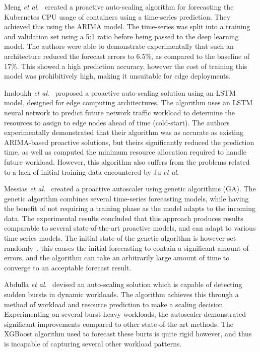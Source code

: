 Meng \textit{et al}.~\cite{meng2016crupa} created a proactive auto-scaling algorithm for forecasting the Kubernetes CPU usage of containers using a time-series prediction. They achieved this using the ARIMA model. The time-series was split into a training and validation set using a 5:1 ratio before being passed to the deep learning model. The authors were able to demonstrate experimentally that such an architecture reduced the forecast errors to 6.5\%, as compared to the baseline of 17\%. This showed a high prediction accuracy, however the cost of training this model was prohibitively high, making it unsuitable for edge deployments.\par

Imdoukh \textit{et al}.~\cite{imdoukh2020machine} proposed a proactive auto-scaling solution using an LSTM model, designed for edge computing architectures. The algorithm uses an LSTM neural network to predict future network traffic workload to determine the resources to assign to edge nodes ahead of time (cold-start). The authors experimentally demonstrated that their algorithm was as accurate as existing ARIMA-based proactive solutions, but theirs significantly reduced the prediction time, as well as computed the minimum resource allocation required to handle future workload. However, this algorithm also suffers from the problems related to a lack of initial training data encountered by Ju \textit{et al}.~\cite{ju2021proactive}\par

Messias \textit{et al}.~\cite{messias2016combining} created a proactive autoscaler using genetic algorithms (GA). The genetic algorithm combines several time-series forecasting models, while having the benefit of not requiring a training phase as the model adapts to the incoming data. The experimental results concluded that this approach produces results comparable to several state-of-the-art proactive models, and can adapt to various time series models. The initial state of the genetic algorithm is however set randomly~\cite{lambora2019genetic}, this causes the initial forecasting to contain a significant amount of errors, and the algorithm can take an arbitrarily large amount of time to converge to an acceptable forecast result.\par

Abdulla \textit{et al}.~\cite{abdullah2020burst} devised an auto-scaling solution which is capable of detecting sudden bursts in dynamic workloads. The algorithm achieves this through a method of workload and resource prediction to make a scaling decision. Experimenting on several burst-heavy workloads, the autoscaler demonstrated significant improvements compared to other state-of-the-art methods. The XGBoost algorithm used to forecast these burts is quite rigid however, and thus is incapable of capturing several other workload patterns.\par

